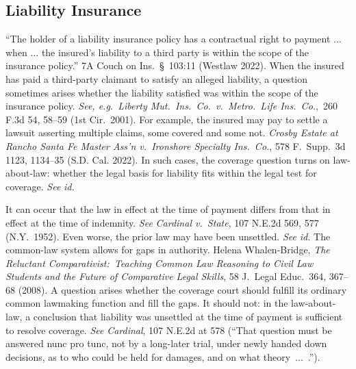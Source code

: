 \documentclass[
  12pt,
  letterpaper,
]{scrartcl}
\begin{document}
\subsection{Liability Insurance}

``The holder of a liability insurance policy has a contractual right to payment
... when ... the insured's liability to a third party is within the scope of
the insurance policy.'' 7A Couch on Ins.~§~103:11 (Westlaw 2022). When the
insured has paid a third-party claimant to satisfy an alleged liability, a
question sometimes arises whether the liability satisfied was within the scope
of the insurance policy. \textit{See, e.g.}~\textit{Liberty
Mut.~Ins.~Co.~v.~Metro.~Life Ins.~Co.},~260 F.3d 54, 58--59 (1st Cir.~2001).
For example, the insured may pay to settle a lawsuit asserting multiple claims,
some covered and some not. \textit{Crosby Estate at Rancho Santa Fe Master
Ass'n v.~Ironshore Specialty Ins.~Co.}, 578 F.~Supp.~3d 1123, 1134--35 (S.D.
Cal. 2022). In such cases, the coverage question turns on law-about-law:
whether the legal basis for liability fits within the legal test for coverage.
\textit{See} \textit{id.}

It can occur that the law in effect at the time of payment differs from that in
effect at the time of indemnity. \textit{See} \textit{Cardinal v.~State}, 107
N.E.2d 569, 577 (N.Y.~1952). Even worse, the prior law may have been unsettled.
\textit{See} \textit{id.} The common-law system allows for gaps in authority.
Helena Whalen-Bridge, \textit{The Reluctant Comparativist:~Teaching Common Law
Reasoning to Civil Law Students and the Future of Comparative Legal Skills}, 58
J.~Legal Educ.~364, 367--68 (2008). A question arises whether the coverage
court should fulfill its ordinary common lawmaking function and fill the gaps.
It should not: in the law-about-law, a conclusion that liability was unsettled
at the time of payment is sufficient to resolve coverage. \textit{See}
\textit{Cardinal}, 107 N.E.2d at 578 (``That question must be answered nunc pro
tunc, not by a long-later trial, under newly handed down decisions, as to who
could be held for damages, and on what theory~...~.'').
\end{document}
